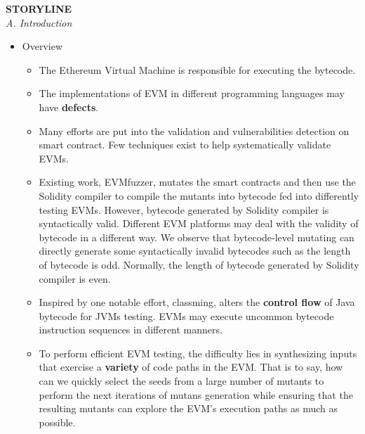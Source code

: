 \documentclass[a4paper]{article}
\begin{document}
		\textbf{STORYLINE}\\
	\textit{A. Introduction}
	\begin{itemize}
		\item Overview
		\begin{itemize}
			\item The Ethereum Virtual Machine is responsible for executing the bytecode.
			\item The implementations of EVM in different programming languages may have \textbf{defects}.
			\item Many efforts are put into the validation and vulnerabilities detection on smart contract. Few techniques exist to help systematically validate EVMs. 
			\item Existing work, EVMfuzzer, mutates the smart contracts and then use the Solidity compiler to compile the mutants into bytecode fed into differently testing EVMs. However, bytecode generated by Solidity compiler is syntactically valid. Different EVM platforms may deal with the validity of bytecode in a different way. We observe that bytecode-level mutating can directly generate some syntactically invalid bytecodes such as the length of bytecode is odd. Normally, the length of bytecode generated by Solidity compiler is even.
			\item Inspired by one notable effort, classming, alters the \textbf{control flow} of Java bytecode for JVMs testing. EVMs may execute uncommon
			bytecode instruction sequences in different manners.
			
			\item To perform
			efficient EVM testing, the difficulty lies in synthesizing inputs that exercise a \textbf{variety} of code paths in the EVM. That is to say, how can we quickly select the seeds from a large number of mutants to perform the next iterations of mutans generation while ensuring that the resulting mutants can explore the EVM's execution paths as much as possible.


\end{itemize}
\end{itemize}
\end{document}
